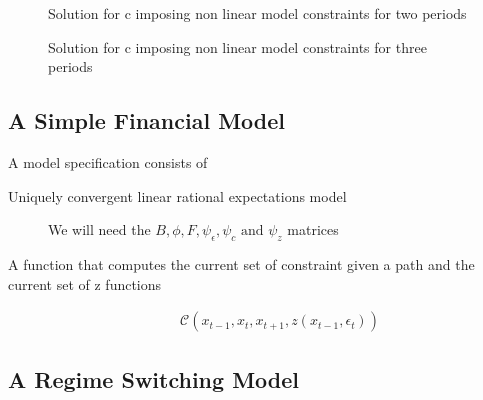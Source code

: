 \documentclass[12pt]{article}
\begin{document}
\begin{figure}
  \centering
  \caption{Solution for c imposing non linear model constraints for two periods}
  \caption{Solution for c imposing non linear model constraints for three periods}
  \label{fig:cfuncsecond}
\end{figure}









\subsection{A Simple Financial Model}
\label{sec:simple-financ-model}

A model specification consists of
\begin{description}
\item[Uniquely convergent linear rational expectations model] 
We will need the $B, \phi, F, \psi_\epsilon, \psi_c \text{ and }\psi_z$ matrices
\item[A function that computes the current set of constraint given a path and the current set of z functions] 
  \begin{gather*}
    \mathcal{C}(x_{t-1},x_{t},x_{t+1},z(x_{t-1},\epsilon_t))
  \end{gather*}
\end{description}
\subsection{A Regime Switching Model}
\label{sec:regime-switch-model}



\cite{foerster13}
\end{document}
